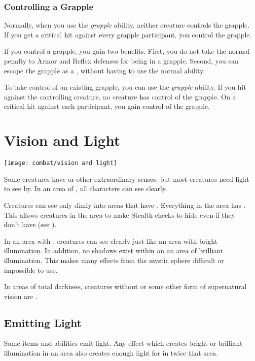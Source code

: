         \subsubsection{Controlling a Grapple}\label{Controlling a Grapple}
            Normally, when you use the \textit{grapple} ability, neither creature controls the grapple.
            If you get a critical hit against every grapple participant, you control the grapple.

            If you control a grapple, you gain two benefits.
            First, you do not take the normal  penalty to Armor and Reflex defenses for being in a grapple.
            Second, you can escape the grapple as a , without having to use the normal  ability.

            To take control of an existing grapple, you can use the \textit{grapple} ability.
            If you hit against the controlling creature, no creature has control of the grapple.
            On a critical hit against each participant, you gain control of the grapple.

\section{Vision and Light}\label{Vision and Light}
    \texttt{[image: combat/vision and light]}

    Some creatures have  or other extraordinary senses, but most creatures need light to see by. 
    In an area of , all characters can see clearly.

    Creatures can see only dimly into areas that have .
    Everything in the area has .
    This allows creatures in the area to make Stealth checks to hide even if they don't have  (see ).

    In an area with , creatures can see clearly just like an area with bright illumination.
    In addition, no shadows exist within an an area of brilliant illumination.
    This makes many effects from the  mystic sphere difficult or impossible to use.

    In areas of total darkness, creatures without  or some other form of supernatural vision are \blinded.

    \subsection{Emitting Light}
        Some items and abilities emit light.
        Any effect which creates bright or brilliant illumination in an area also creates enough light for  in twice that area.

